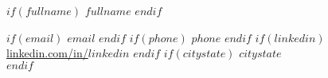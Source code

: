 \begin{center}
$if(fullname)$
{\fontsize{18}{0}\selectfont\scshape $fullname$}
$endif$
\end{center}
\begin{center}
$if(email)$
\href{mailto: $email$}{\faEnvelope\enspace $email$}\hfill
$endif$
$if(phone)$
\href{tel: $phone$}{\faPhone\enspace $phone$}\hfill
$endif$
$if(linkedin)$
\href{https://linkedin.com/in/$linkedin$}{\faLinkedinIn\enspace linkedin.com/in/$linkedin$}\hfill
$endif$
$if(citystate)$
\faMapMarker\enspace $citystate$\\
$endif$
\noindent\makebox[\linewidth]{\rule{\textwidth}{0.5pt}}
\end{center}
\renewcommand{\labelitemi}{-}
